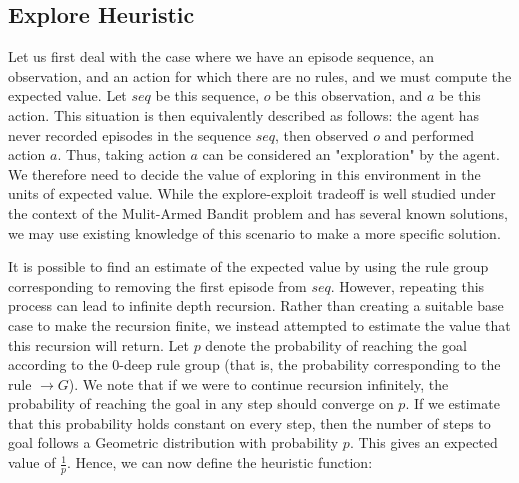 \documentclass[letterpaper]{article} %
\begin{document}
\subsection{Explore Heuristic}
Let us first deal with the case where we have an episode sequence, an observation, and an action for which there are no rules, and we must compute the expected value. Let $seq$ be this sequence, $o$ be this observation, and $a$ be this action. This situation is then equivalently described as follows: the agent has never recorded episodes in the sequence $seq$, then observed $o$ and performed action $a$. Thus, taking action $a$ can be considered an "exploration" by the agent. We therefore need to decide the value of exploring in this environment in the units of expected value. While the explore-exploit tradeoff is well studied under the context of the Mulit-Armed Bandit problem and has several known solutions, we may use existing knowledge of this scenario to make a more specific solution.

It is possible to find an estimate of the expected value by using the rule group corresponding to removing the first episode from $seq$. However, repeating this process can lead to infinite depth recursion. Rather than creating a suitable base case to make the recursion finite, we instead attempted to estimate the value that this recursion will return. Let $p$ denote the probability of reaching the goal according to the $0$-deep rule group (that is, the probability corresponding to the rule $\rightarrow G$). We note that if we were to continue recursion infinitely, the probability of reaching the goal in any step should converge on $p$. If we estimate that this probability holds constant on every step, then the number of steps to goal follows a Geometric distribution with probability $p$. This gives an expected value of $\frac{1}{p}$. Hence, we can now define the heuristic function:
\end{document}

